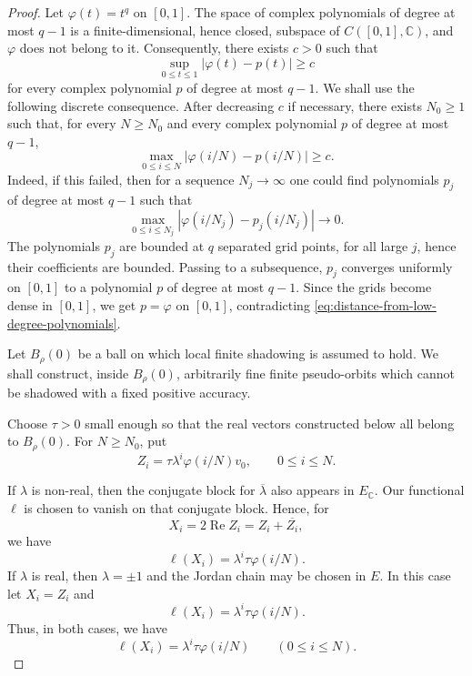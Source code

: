\documentclass[12pt]{amsart}
\theoremstyle{definition}
\numberwithin{equation}{section}
\theoremstyle{remark}
\begin{document}
\begin{proof}
Let $\varphi(t)=t^q$ on $[0,1]$. The space of complex polynomials of degree
at most $q-1$ is a finite-dimensional, hence closed, subspace of
$C([0,1],\mathbb C)$, and $\varphi$ does not belong to it. Consequently,
there exists $c>0$ such that
\begin{equation}\label{eq:distance-from-low-degree-polynomials}
\sup_{0\leq t\leq 1}|\varphi(t)-p(t)|\geq c
\end{equation}
for every complex polynomial $p$ of degree at most $q-1$. We shall use the following
discrete consequence. After decreasing $c$ if necessary, there exists
$N_0\geq 1$ such that, for every $N\geq N_0$ and every complex polynomial $p$ of
degree at most $q-1$,
\begin{equation}\label{eq:discrete-polynomial-separation}
\max_{0\leq i\leq N}|\varphi(i/N)-p(i/N)|\geq c.
\end{equation}
Indeed, if this failed, then for a sequence $N_j\to\infty$ one could find
polynomials $p_j$ of degree at most $q-1$ such that
\[
\max_{0\leq i\leq N_j}|\varphi(i/N_j)-p_j(i/N_j)|\to 0.
\]
The polynomials $p_j$ are bounded at $q$ separated grid points, for all
large $j$, hence their coefficients are bounded. Passing to a subsequence,
$p_j$ converges uniformly on $[0,1]$ to a polynomial $p$ of degree at most
$q-1$. Since the grids become dense in $[0,1]$, we get $p=\varphi$ on
$[0,1]$, contradicting \eqref{eq:distance-from-low-degree-polynomials}.

Let $B_\rho(0)$ be a ball on which local finite shadowing is assumed to hold. We shall construct, inside $B_\rho(0)$, arbitrarily fine
finite pseudo-orbits which cannot be shadowed with a fixed positive
accuracy.

Choose $\tau>0$ small enough so that the real vectors constructed below all
belong to $B_\rho(0)$. For $N\geq N_0$, put
\[
Z_i=\tau\lambda^i\varphi(i/N)v_0,\qquad 0\leq i\leq N.
\]

If $\lambda$ is non-real, then the conjugate block for $\overline{\lambda}$
also appears in $E_{\mathbb C}$. Our functional $\ell$ is chosen to vanish
on that conjugate block. Hence, for
\[
X_i=2\operatorname{Re} Z_i=Z_i+\overline{Z_i},
\]
we have
\[
\ell(X_i)
=
\lambda^i\tau\varphi(i/N).
\]
If $\lambda$ is real, then $\lambda=\pm1$ and the Jordan chain may be
chosen in $E$. In this case let $X_i=Z_i$ and
\[
\ell(X_i)=\lambda^i\tau\varphi(i/N).
\]
Thus, in both cases, we have
\begin{equation}\label{eq:ell-Xi}
\ell(X_i)=\lambda^i\tau\varphi(i/N)
\qquad (0\leq i\leq N).
\end{equation}






\end{proof}
\end{document}
